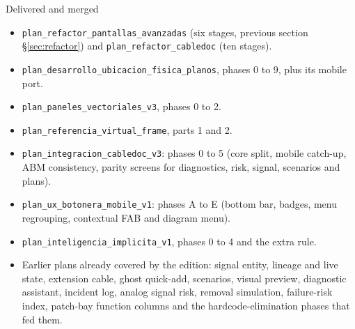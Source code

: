 \documentclass[10.4pt,twocolumn]{article}
\begin{document}
\begin{specbox}{Delivered and merged}
\begin{itemize}[leftmargin=1.0em,itemsep=1pt,topsep=2pt]
\item \texttt{plan\_refactor\_pantallas\_avanzadas} (six stages, previous section \S\ref{sec:refactor}) and \texttt{plan\_refactor\_cabledoc} (ten stages).
\item \texttt{plan\_desarrollo\_ubicacion\_fisica\_planos}, phases 0 to 9, plus its mobile port.
\item \texttt{plan\_paneles\_vectoriales\_v3}, phases 0 to 2.
\item \texttt{plan\_referencia\_virtual\_frame}, parts 1 and 2.
\item \texttt{plan\_integracion\_cabledoc\_v3}: phases 0 to 5 (core split, mobile catch-up, ABM consistency, parity screens for diagnostics, risk, signal, scenarios and plans).
\item \texttt{plan\_ux\_botonera\_mobile\_v1}: phases A to E (bottom bar, badges, menu regrouping, contextual FAB and diagram menu).
\item \texttt{plan\_inteligencia\_implicita\_v1}, phases 0 to 4 and the extra rule.
\item Earlier plans already covered by the edition: signal entity, lineage and live state, extension cable, ghost quick-add, scenarios, visual preview, diagnostic assistant, incident log, analog signal risk, removal simulation, failure-risk index, patch-bay function columns and the hardcode-elimination phases that fed them.
\end{itemize}
\end{specbox}
\end{document}
